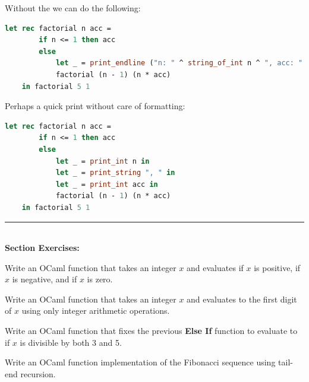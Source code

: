 \noindent
Without the  we can do the following:

\begin{lstlisting}[language=OCaml, caption={Print Debugging Without Printf}]
    let rec factorial n acc =
        if n <= 1 then acc
        else 
            let _ = print_endline ("n: " ^ string_of_int n ^ ", acc: " ^ string_of_int acc) in
            factorial (n - 1) (n * acc)
    in factorial 5 1
\end{lstlisting}

\noindent
Perhaps a quick print without care of formatting:

\begin{lstlisting}[language=OCaml, caption={Dirty Print Debugging}]
    let rec factorial n acc =
        if n <= 1 then acc
        else 
            let _ = print_int n in
            let _ = print_string ", " in
            let _ = print_int acc in
            factorial (n - 1) (n * acc)
    in factorial 5 1
\end{lstlisting}

\vspace{1em}
\noindent
\rule{\textwidth}{0.4pt}\\
\textbf{Section Exercises:}\\

\begin{Exercise}
Write an OCaml function that takes an integer $x$ and evaluates  if $x$ is positive,  if $x$ is negative, and  if $x$ is zero.
\end{Exercise}
    
    
\vspace{1em}
\begin{Exercise}
Write an OCaml function that takes an integer $x$ and evaluates to the first digit of $x$ using only integer arithmetic operations.
\end{Exercise}

\vspace{1em}
\begin{Exercise}
Write an OCaml function that fixes the previous \textbf{Else If} function to evaluate to  if $x$ is divisible by both 3 and 5.
\end{Exercise}

\vspace{1em}
\begin{Exercise}
Write an OCaml function implementation of the Fibonacci sequence using tail-end recursion.
\end{Exercise}




